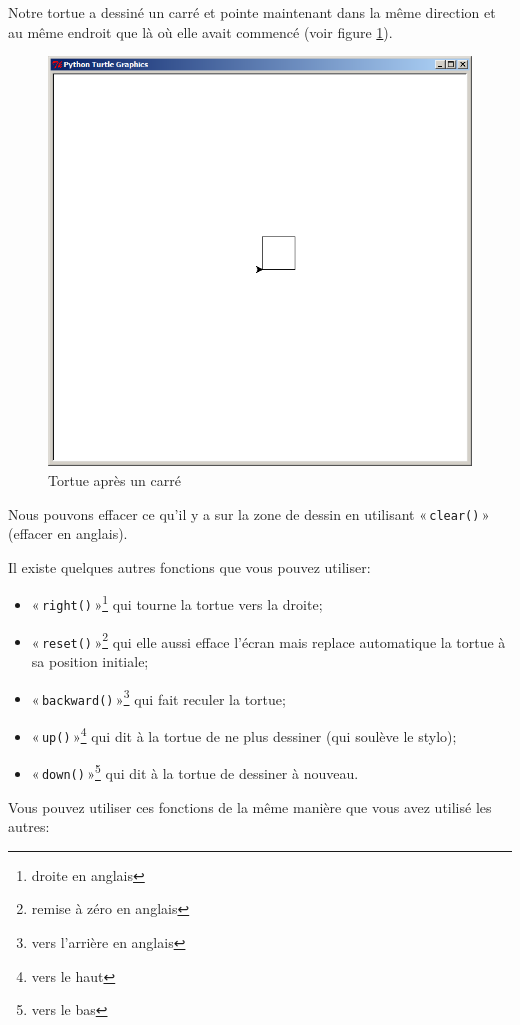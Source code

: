 Notre tortue a dessiné un carré et pointe maintenant dans la même direction et au même endroit que là où elle avait commencé (voir figure \ref{fig:tcar}).
\begin{figure}[!ht]
\centering
\includegraphics[scale=0.3]{images/tcar.png}
\caption{Tortue après un carré}
\label{fig:tcar}
\end{figure}

Nous pouvons effacer ce qu'il y a sur la zone de dessin en utilisant « \texttt{clear()} » (effacer en anglais).

Il  existe quelques autres fonctions que vous pouvez utiliser: 
\begin{itemize}
\item « \texttt{right()} »\footnote{droite en anglais} qui tourne la tortue vers la droite;
\item « \texttt{reset()} »\footnote{remise à zéro en anglais} qui elle aussi efface l'écran mais replace automatique la tortue à sa position initiale;
\item « \texttt{backward()} »\footnote{vers l'arrière en anglais} qui fait reculer la tortue;
\item « \texttt{up()} »\footnote{vers le haut} qui dit à la tortue de ne plus dessiner (qui soulève le stylo);
\item « \texttt{down()} »\footnote{vers le bas} qui dit à la tortue de dessiner à nouveau.
\end{itemize}
 Vous pouvez utiliser ces fonctions de la même manière que vous avez utilisé les autres:
 
